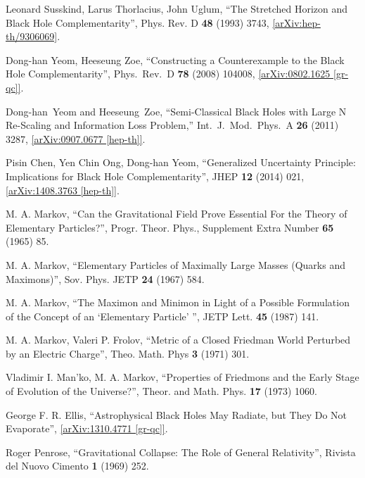 \documentclass[12pt]{article}
\newcommand{\2}{$^2$}
\newcommand{\3}{$^3$}
\newcommand{\4}{$_4$}
\newcommand{\5}{$_5$}
\begin{document}
\begin{thebibliography}{400}
Leonard Susskind, Larus Thorlacius, John Uglum, ``The Stretched Horizon and Black Hole Complementarity'', Phys. Rev. D \textbf{48} (1993) 3743, \href{http://arxiv.org/abs/hep-th/9306069}{[arXiv:hep-th/9306069]}.

  Dong-han Yeom, Heeseung Zoe,
  ``Constructing a Counterexample to the Black Hole Complementarity'',
  Phys.\ Rev.\  D {\bf 78} (2008) 104008, \href{http://arxiv.org/abs/0802.1625}{
 [arXiv:0802.1625 [gr-qc]]}.

	Dong-han~Yeom and Heeseung~Zoe,
  ``Semi-Classical Black Holes with Large N Re-Scaling and Information Loss Problem,''
  Int.\ J.\ Mod.\ Phys.\ A {\bf 26} (2011) 3287, \href{http://arxiv.org/abs/0907.0677}{
  [arXiv:0907.0677 [hep-th]]}.
  
Pisin Chen, Yen Chin Ong, Dong-han Yeom, ``Generalized Uncertainty Principle: Implications for Black Hole Complementarity'', JHEP \textbf{12} (2014) 021, \href{http://arxiv.org/abs/1408.3763}{[arXiv:1408.3763 [hep-th]]}.



  M. A. Markov, ``Can the Gravitational Field Prove Essential For the Theory of
Elementary Particles?'', Progr. Theor. Phys., Supplement Extra Number \textbf{65} (1965) 85.

M. A. Markov, ``Elementary Particles of Maximally Large Masses (Quarks and Maximons)'', Sov. Phys. JETP \textbf{24} (1967) 584. 

M. A. Markov, ``The Maximon and Minimon in Light of a Possible Formulation of the Concept of an `Elementary Particle' '', JETP Lett. \textbf{45} (1987) 141.

M. A. Markov, Valeri P. Frolov, ``Metric of a Closed Friedman World Perturbed by an Electric Charge'', Theo. Math. Phys \textbf{3} (1971) 301.

Vladimir I. Man'ko, M. A. Markov, ``Properties of Friedmons and the Early Stage of Evolution of the Universe?'', Theor. and Math. Phys. \textbf{17} (1973) 1060.





George F. R. Ellis, ``Astrophysical Black Holes May Radiate, but They Do Not Evaporate'', \href{http://arxiv.org/abs/1310.4771}{[arXiv:1310.4771 [gr-qc]]}.

Roger Penrose, ``Gravitational Collapse: The Role of General Relativity'', Rivista del Nuovo Cimento \textbf{1} (1969) 252.


\end{thebibliography}
\end{document}
